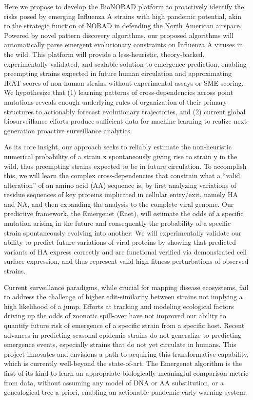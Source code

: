 \documentclass[onecolumn, compsoc,12pt]{IEEEtran}
\begin{document}
Here we propose to develop the BioNORAD platform to proactively identify  the risks posed by emerging Influenza A strains with high pandemic potential, akin to the strategic function of NORAD in defending the North American airspace. Powered by novel pattern discovery algorithms, our proposed algorithms will automatically parse emergent evolutionary constraints on Influenza A viruses in the wild. This platform will provide a less-heuristic, theory-backed, experimentally validated, and scalable solution to emergence prediction, enabling preempting strains expected in future human circulation and approximating IRAT scores of non-human strains without experimental assays or SME scoring. We hypothesize that (1) learning patterns of cross-dependencies across point mutations 
reveals enough underlying rules of organization of their primary structures to actionably forecast evolutionary trajectories, and (2) current global biosurveillance efforts produce sufficient data for  machine learning to realize  next-generation proactive surveillance analytics.

As its core insight, our approach seeks to reliably estimate the non-heuristic numerical probability of a strain x spontaneously giving rise to strain y in the wild, thus preempting strains expected to be in future circulation. To accomplish this, we will learn the complex cross-dependencies that constrain what a ``valid alteration'' of an amino acid (AA) sequence is, by first analyzing variations of residue sequences of key proteins implicated in cellular entry/exit, namely HA and NA, and then expanding the analysis to the complete viral genome. Our predictive framework, the Emergenet (Enet), will estimate the odds of a specific mutation arising in the future and consequently the probability of a specific strain spontaneously evolving into another. We will experimentally validate our ability to predict future variations of viral proteins by showing that \enet predicted variants of HA express correctly and are functional verified via demonstrated cell surface expression,   and thus represent valid  high fitness perturbations of observed strains.

Current surveillance paradigms, while crucial for mapping disease ecosystems, fail to address the challenge of higher edit-similarity between strains not implying a high likelihood of a jump.  Efforts at tracking and modeling ecological factors driving up the odds of zoonotic spill-over have not improved our ability to quantify future risk of emergence of a specific strain from a specific host.
Recent advances in predicting seasonal epidemic strains do not generalize to predicting emergence events, especially strains that do not yet circulate in humans. This project innovates and envisions a path to acquiring this transformative capability, which is currently well-beyond the state-of-art. The Emergenet algorithm is the first of its kind to learn an appropriate biologically meaningful comparison metric from data, without assuming any model of DNA or AA substitution, or a genealogical tree a priori, enabling an actionable pandemic early warning system.
\end{document}
